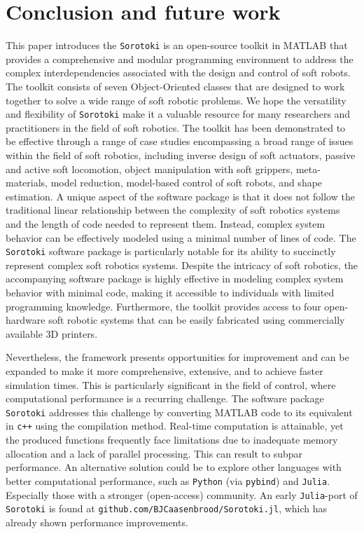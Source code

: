 
\section{Conclusion and future work}
\label{sec:C5:conclusion}
This paper introduces the \texttt{Sorotoki} is an open-source toolkit in {MATLAB} that provides a comprehensive and modular programming environment to address the complex interdependencies associated with the design and control of soft robots. The toolkit consists of seven Object-Oriented classes that are designed to work together to solve a wide range of soft robotic problems. We hope the versatility and flexibility of \texttt{Sorotoki} make it a valuable resource for many researchers and practitioners in the field of soft robotics. The toolkit has been demonstrated to be effective through a range of case studies encompassing a broad range of issues within the field of soft robotics, including inverse design of soft actuators, passive and active soft locomotion, object manipulation with soft grippers, meta-materials, model reduction, model-based control of soft robots, and shape estimation. A unique aspect of the software package is that it does not follow the traditional linear relationship between the complexity of soft robotics systems and the length of code needed to represent them. Instead, complex system behavior can be effectively modeled using a minimal number of lines of code. The \texttt{Sorotoki} software package is particularly notable for its ability to succinctly represent complex soft robotics systems. Despite the intricacy of soft robotics, the accompanying software package is highly effective in modeling complex system behavior with minimal code, making it accessible to individuals with limited programming knowledge. Furthermore, the toolkit provides access to four open-hardware soft robotic systems that can be easily fabricated using commercially available 3D printers.

Nevertheless, the framework presents opportunities for improvement and can be expanded to make it more comprehensive, extensive, and to achieve faster simulation times. This is particularly significant in the field of control, where computational performance is a recurring challenge. The software package \texttt{Sorotoki} addresses this challenge by converting {MATLAB} code to its equivalent in \texttt{c++} using the compilation method. Real-time computation is attainable, yet the produced  functions frequently face limitations due to inadequate memory allocation and a lack of parallel processing. This can result to subpar performance. An alternative solution could be to explore other languages with better computational performance, such as \texttt{Python} (via \texttt{pybind}) and \texttt{Julia}. Especially those with a stronger (open-access) community. An early \texttt{Julia}-port of \texttt{Sorotoki} is found at \texttt{github.com/BJCaasenbrood/Sorotoki.jl}, which has already shown performance improvements.

